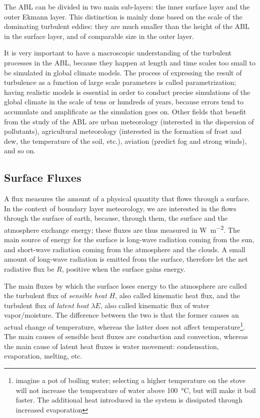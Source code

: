 \documentclass[12pt]{book}
\begin{document}
The ABL can be divided in two main sub-layers: the inner surface layer and the outer Ekmann layer. This distinction is mainly done based on the scale of the dominating turbulent eddies: they are much smaller than the height of the ABL in the surface layer, and of comparable size in the outer layer.

It is very important to have a macroscopic understanding of the turbulent processes in the ABL, because they happen at length and time scales too small to be simulated in global climate models. The process of expressing the result of turbulence as a function of large scale parameters is called parametrization; having realistic models is essential in order to conduct precise simulations of the global climate in the scale of tens or hundreds of years, because errors tend to accumulate and amplificate as the simulation goes on. Other fields that benefit from the study of the ABL are urban meteorology (interested in the dispersion of pollutants), agricultural meteorology (interested in the formation of frost and dew, the temperature of the soil, etc.), aviation (predict fog and strong winds), and so on.

\subsection{Surface Fluxes}
A flux measures the amount of a physical quantity that flows through a surface. In the context of boundary layer meteorology, we are interested in the flows through the surface of earth, because, through them, the surface and the atmosphere exchange energy; these fluxes are thus measured in \si{\watt\per\square\meter}. The main source of energy for the surface is long-wave radiation coming from the sun, and short-wave radiation coming from the atmosphere and the clouds. A small amount of long-wave radiation is emitted from the surface, therefore let the net radiative flux be $R$, positive when the surface gains energy.

The main fluxes by which the surface loses energy to the atmosphere are called the turbulent flux of \emph{sensible heat} $H$, also called kinematic heat flux, and the turbulent flux of \emph{latent heat} $\lambda E$, also called kinematic flux of water vapor/moisture. The difference between the two is that the former causes an actual change of temperature, whereas the latter does not affect temperature\footnote{imagine a pot of boiling water; selecting a higher temperature on the stove will not increase the temperature of water above \SI{100}{\celsius}, but will make it boil faster. The additional heat introduced in the system is dissipated through increased evaporation}. The main causes of sensible heat fluxes are conduction and convection, whereas the main cause of latent heat fluxes is water movement: condensation, evaporation, melting, etc. 
\end{document}
